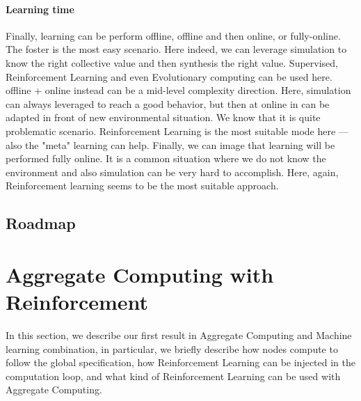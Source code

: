 \documentclass[
  twocolumn,
]{ceurart}
\begin{document}
\paragraph{Learning time}
 Finally, learning can be perform offline, offline and then online, or fully-online.
 The foster is the most easy scenario. Here indeed, we can leverage simulation to know the right 
 collective value and then synthesis the right value. Supervised, Reinforcement Learning and even Evolutionary 
 computing can be used here. offline + online instead can be a mid-level complexity direction.
 Here, simulation can always leveraged to reach a good behavior, but then at online in can be
 adapted in front of new environmental situation. We know that it is quite problematic scenario. Reinforcement 
 Learning is the most suitable mode here --- also the "meta" learning can help.
 Finally, we can image that learning will be performed fully online. It is a common situation where
 we do not know the environment and also simulation can be very hard to accomplish. Here, again, Reinforcement learning
 seems to be the most suitable approach.

 

\subsection{Roadmap}

\section{Aggregate Computing with Reinforcement}
In this section, we describe our first result in Aggregate Computing and Machine learning combination,
 in particular, we briefly describe how nodes compute to follow the global specification,
 how Reinforcement Learning can be injected in the computation loop,
 and what kind of Reinforcement Learning can be used with Aggregate Computing.
\end{document}
